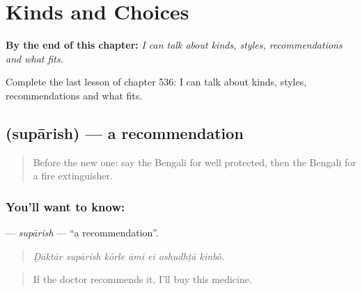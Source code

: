 
\chapter{Kinds and Choices}
\label{ch:bn-kinds-and-choices}

\begin{chapteropening}
\textbf{By the end of this chapter:} \emph{I can talk about kinds, styles, recommendations and what fits.}

Complete the last lesson of chapter 536: I can talk about kinds, styles, recommendations and what fits.
\end{chapteropening}

\section[\texorpdfstring{\bn{সুপারিশ} (supārish)}{সুপারিশ (supārish)}]{ (supārish) — a recommendation}

\label{lesson:BN-C536-suparish}



\begin{quote}
Before the new one: say the Bengali for well protected, then the Bengali for a fire extinguisher.
\end{quote}

\subsection*{You'll want to know: }
\textbf{} — \emph{supārish} — \textquotedblleft{}a recommendation\textquotedblright{}.

\begin{quote}
      
\end{quote}

\begin{quote}
\emph{Ḍāktār supārish kôrle āmi ei oshudhṭā kinbô.}
\end{quote}

\begin{quote}
If the doctor recommends it, I'll buy this medicine.
\end{quote}

